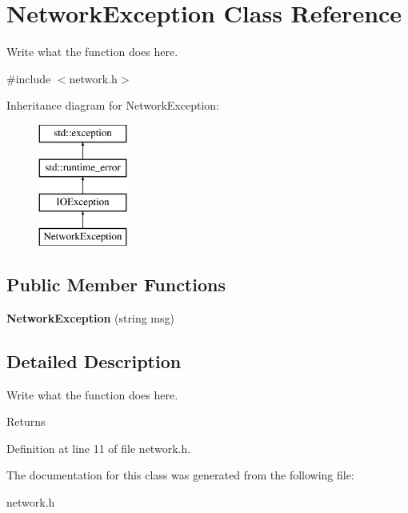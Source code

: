 \hypertarget{classNetworkException}{\section{Network\+Exception Class Reference}
\label{classNetworkException}
}


Write what the function does here.  




{\ttfamily \#include $<$network.\+h$>$}

Inheritance diagram for Network\+Exception\+:\begin{figure}[H]
\begin{center}
\leavevmode
\includegraphics[height=4.000000cm]{classNetworkException}
\end{center}
\end{figure}
\subsection*{Public Member Functions}
\begin{DoxyCompactItemize}
\item 
\hypertarget{classNetworkException_a7b2fde9c75da04d6a3d9e5bb332594ac}{{\bfseries Network\+Exception} (string msg)}\label{classNetworkException_a7b2fde9c75da04d6a3d9e5bb332594ac}

\end{DoxyCompactItemize}


\subsection{Detailed Description}
Write what the function does here. 

\begin{DoxyReturn}{Returns}

\end{DoxyReturn}


Definition at line 11 of file network.\+h.



The documentation for this class was generated from the following file\+:\begin{DoxyCompactItemize}
\item 
network.\+h\end{DoxyCompactItemize}
